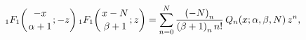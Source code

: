 \[\mathop{{{}_{1}F_{1}}\/}\nolimits\!\left({-x\atop\alpha+1};-z\right)\mathop{{{%
}_{1}F_{1}}\/}\nolimits\!\left({x-N\atop\beta+1};z\right)=\sum_{n=0}^{N}\frac{%
\left(-N\right)_{n}}{\left(\beta+1\right)_{n}n!}\mathop{Q_{n}\/}\nolimits\!%
\left(x;\alpha,\beta,N\right)z^{n},\]